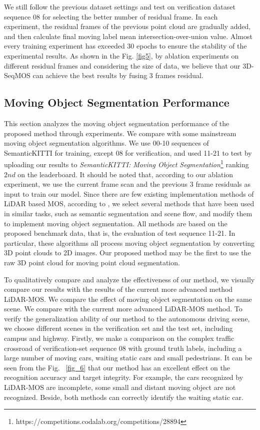 \documentclass[lettersize,journal]{IEEEtran}
\begin{document}
We still follow the previous dataset settings and test on verification dataset sequence 08 for selecting the better number of residual frame. In each experiment, the residual frames of the previous point cloud are gradually added, and then calculate final moving label mean intersection-over-union value. Almost every training experiment has exceeded 30 epochs to ensure the stability of the experimental results. As shown in the Fig. \ref{fig5}, by ablation experiments on different residual frames and considering the size of data, we believe that our 3D-SeqMOS can achieve the best results by fusing 3 frames residual. 

\subsection{Moving Object Segmentation Performance}


This section analyzes the moving object segmentation performance of the proposed method through experiments. We compare with some mainstream moving object segmentation algorithms. We use 00-10 sequences of SemanticKITTI for training, except 08 for verification, and used 11-21 to test by uploading our results to \emph{SemanticKITTI: Moving Object Segmentation}\footnote{https://competitions.codalab.org/competitions/28894} ranking $2nd$ on the leaderboard. It should be noted that, according to our ablation experiment, we use the current frame scan and the previous 3 frame residuals as input to train our model. Since there are few existing implementation methods of LiDAR based MOS, according to  \cite{chen2021moving}, we select several methods that have been used in similar tasks, such as semantic segmentation and scene flow, and modify them to implement moving object segmentation. All methods are based on the proposed benchmark data, that is, the evaluation of test sequence 11-21. In particular, these algorithms all process moving object segmentation by converting 3D point clouds to 2D images. Our proposed method may be the first to use the raw 3D point cloud for moving point cloud segmentation. 

To qualitatively compare and analyze the effectiveness of our method, we visually compare our results with the results of the current more advanced method LiDAR-MOS. We compare the effect of moving object segmentation on the same scene. We compare with the current more advanced LiDAR-MOS method. To verify the generalization ability of our method to the autonomous driving scene, we choose different scenes in the verification set and the test set, including campus and highway. Firstly, we make a comparison on the complex traffic crossroad of verification-set sequence 08 with ground truth labels, including a large number of moving cars, waiting static cars and small pedestrians. It can be seen from the Fig. ~\ref{fig_6} that our method has an excellent effect on the recognition accuracy and target integrity. For example, the cars recognized by LiDAR-MOS are incomplete, some small and distant moving object are not recognized. Beside, both methods can correctly identify the waiting static car.
\end{document}
